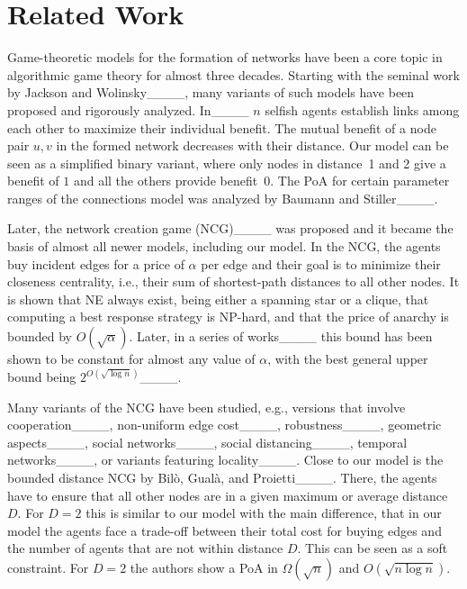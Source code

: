 \section{Related Work}
Game-theoretic models for the formation of networks have been a core topic in algorithmic game theory for almost three decades. Starting with the seminal work by Jackson and Wolinsky____, many variants of such models have been proposed and rigorously analyzed. In____ $n$ selfish agents establish links among each other to maximize their individual benefit. The mutual benefit of a node pair $u,v$ in the formed network decreases with their distance. Our model can be seen as a simplified binary variant, where only nodes in distance~1 and 2 give a benefit of $1$ and all the others provide benefit~$0$. The PoA for certain parameter ranges of the connections model was analyzed by Baumann and Stiller____.

Later, the network creation game (NCG)____ was proposed and it became the basis of almost all newer models, including our model. In the NCG, the agents buy incident edges for a price of $\alpha$ per edge and their goal is to minimize their closeness centrality, i.e., their sum of shortest-path distances to all other nodes. It is shown that NE always exist, being either a spanning star or a clique, that computing a best response strategy is NP-hard, and that the price of anarchy is bounded by $O(\sqrt{\alpha})$. Later, in a series of works____ this bound has been shown to be constant for almost any value of $\alpha$, with the best general upper bound being $2^{O(\sqrt{\log n})}$____.

Many variants of the NCG have been studied, e.g., versions that involve cooperation____, non-uniform edge cost____, robustness____, geometric aspects____, social networks____, social distancing____, temporal networks____, or variants featuring locality____. 
Close to our model is the bounded distance NCG by Bilò, Gualà, and Proietti____. 
There, the agents have to ensure that all other nodes are in a given maximum or average distance $D$. For $D=2$ this is similar to our model with the main difference, that in our model the agents face a trade-off between their total cost for buying edges and the number of agents that are not within distance $D$. This can be seen as a soft constraint. For $D=2$ the authors show a PoA in $\Omega(\sqrt{n})$ and $O(\sqrt{n\log n})$.

